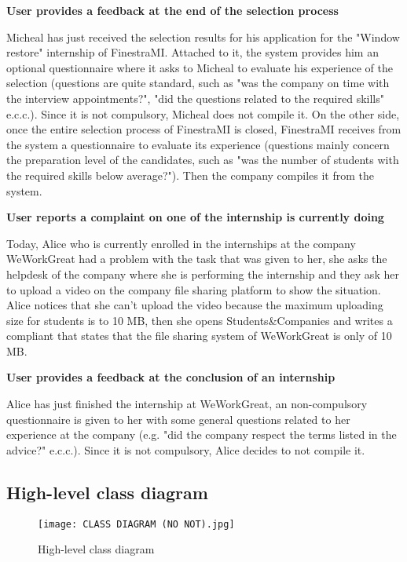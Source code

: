 			\textbf{User provides a feedback at the end of the selection process}
			\begin{flushleft}
				Micheal has just received the selection results for his application for the "Window restore" internship of FinestraMI. Attached to it, the system provides him an optional questionnaire where it asks to Micheal to evaluate his experience of the selection (questions are quite standard, such as "was the company on time with the interview appointments?", "did the questions related to the required skills" e.c.c.). Since it is not compulsory, Micheal does not compile it. On the other side, once the entire selection process of FinestraMI is closed, FinestraMI receives from the system a questionnaire to evaluate its experience (questions mainly concern the preparation level of the candidates, such as "was the number of students with the required skills below average?"). Then the company compiles it from the system.
			\end{flushleft}
			\textbf{User reports a complaint on one of the internship is currently doing}
			\begin{flushleft}
				Today, Alice who is currently enrolled in the internships at the company WeWorkGreat had a problem with the task that was given to her, she asks the helpdesk of the company where she is performing the internship and they ask her to upload a video on the company file sharing platform to show the situation. Alice notices that she can’t upload the video because the maximum uploading size for students is to 10 MB, then she opens Students\&Companies and writes a compliant that states that the file sharing system of WeWorkGreat is only of 10 MB.
			\end{flushleft}
			\textbf{User provides a feedback at the conclusion of an internship}
			\begin{flushleft}
				Alice has just finished the internship at WeWorkGreat, an non-compulsory questionnaire is given to her with some general questions related to her experience at the company (e.g. "did the company respect the terms listed in the advice?" e.c.c.). Since it is not compulsory, Alice decides to not compile it.
			\end{flushleft}
		\subsection{High-level class diagram}
			\begin{figure}[H]
				\centering
				\texttt{[image: CLASS DIAGRAM (NO NOT).jpg]}
				\caption{High-level class diagram}
			\end{figure}
			
